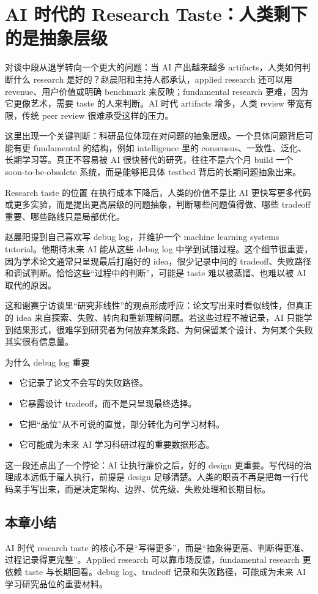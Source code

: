\section{AI 时代的 Research Taste：人类剩下的是抽象层级}

对谈中段从退学转向一个更大的问题：当 AI 产出越来越多 artifacts，人类如何判断什么 research 是好的？赵晨阳和主持人都承认，applied research 还可以用 revenue、用户价值或明确 benchmark 来反映；fundamental research 更难，因为它更像艺术，需要 taste 的人来判断。AI 时代 artifacts 增多，人类 review 带宽有限，传统 peer review 很难承受这样的压力。

这里出现一个关键判断：科研品位体现在对问题的抽象层级。一个具体问题背后可能有更 fundamental 的结构，例如 intelligence 里的 consensus、一致性、泛化、长期学习等。真正不容易被 AI 很快替代的研究，往往不是六个月 build 一个 soon-to-be-obsolete 系统，而是能够把具体 testbed 背后的长期问题抽象出来。

\begin{importantbox}{Research taste 的位置}
在执行成本下降后，人类的价值不是比 AI 更快写更多代码或更多实验，而是提出更高层级的问题抽象，判断哪些问题值得做、哪些 tradeoff 重要、哪些路线只是局部优化。
\end{importantbox}

赵晨阳提到自己喜欢写 debug log，并维护一个 machine learning systems tutorial。他期待未来 AI 能从这些 debug log 中学到试错过程。这个细节很重要，因为学术论文通常只呈现最后打磨好的 idea，很少记录中间的 tradeoff、失败路径和调试判断。恰恰这些“过程中的判断”，可能是 taste 难以被蒸馏、也难以被 AI 取代的原因。

这和谢赛宁访谈里“研究非线性”的观点形成呼应：论文写出来时看似线性，但真正的 idea 来自探索、失败、转向和重新理解问题。若这些过程不被记录，AI 只能学到结果形式，很难学到研究者为何放弃某条路、为何保留某个设计、为何某个失败其实很有信息量。

\begin{knowledgebox}{为什么 debug log 重要}
\begin{itemize}
  \item 它记录了论文不会写的失败路径。
  \item 它暴露设计 tradeoff，而不是只呈现最终选择。
  \item 它把“品位”从不可说的直觉，部分转化为可学习材料。
  \item 它可能成为未来 AI 学习科研过程的重要数据形态。
\end{itemize}
\end{knowledgebox}

这一段还点出了一个悖论：AI 让执行廉价之后，好的 design 更重要。写代码的治理成本远低于雇人执行，前提是 design 足够清楚。人类的职责不再是把每一行代码亲手写出来，而是决定架构、边界、优先级、失败处理和长期目标。

\subsection{本章小结}

AI 时代 research taste 的核心不是“写得更多”，而是“抽象得更高、判断得更准、过程记录得更完整”。Applied research 可以靠市场反馈，fundamental research 更依赖 taste 与长期回看。debug log、tradeoff 记录和失败路径，可能成为未来 AI 学习研究品位的重要材料。


